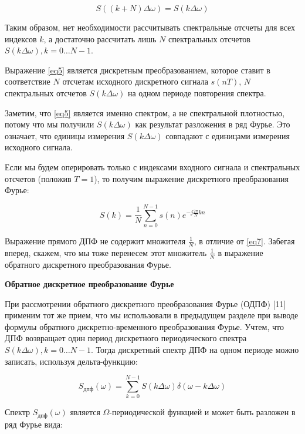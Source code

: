 \begin{equation}
\label{eq6}
S((k+N)\Delta \omega) = S(k \Delta \omega)
\end{equation}

Таким образом, нет необходимости рассчитывать спектральные отсчеты для всех индексов \( k \), а достаточно рассчитать лишь \( N \) спектральных отсчетов \( S(k \Delta \omega), k = 0 \ldots N-1 \).

Выражение \eqref{eq5} является дискретным преобразованием, которое ставит в соответствие \( N \) отсчетам исходного дискретного сигнала \( s(nT) \), \( N \) спектральных отсчетов \( S(k \Delta \omega) \) на одном периоде повторения спектра.

Заметим, что \eqref{eq5} является именно спектром, а не спектральной плотностью, потому что мы получили \( S(k \Delta \omega) \) как результат разложения в ряд Фурье. Это означает, что единицы измерения \( S(k \Delta \omega) \) совпадают с единицами измерения исходного сигнала.

Если мы будем оперировать только с индексами входного сигнала и спектральных отсчетов (положив \( T = 1 \)), то получим выражение дискретного преобразования Фурье:

\begin{equation}
\label{eq7}
S(k) = \frac{1}{N} \sum_{n=0}^{N-1} s(n) e^{-j\frac{2\pi}{N}kn} \tag{2.6}
\end{equation}

Выражение прямого ДПФ не содержит множителя \( \frac{1}{N} \), в отличие от \eqref{eq7}. Забегая вперед, скажем, что мы тоже перенесем этот множитель \( \frac{1}{N} \) в выражение обратного дискретного преобразования Фурье.

\textbf{Обратное дискретное преобразование Фурье}

При рассмотрении обратного дискретного преобразования Фурье (ОДПФ) [11] применим тот же прием, что мы использовали в предыдущем разделе при выводе формулы обратного дискретно-временного преобразования Фурье. Учтем, что ДПФ возвращает один период дискретного периодического спектра \( S(k \Delta \omega), k = 0 \ldots N-1 \). Тогда дискретный спектр ДПФ на одном периоде можно записать, используя дельта-функцию:

\begin{equation}
\label{eq8}
S_{\text{дпф}}(\omega) = \sum_{k=0}^{N-1} S(k \Delta \omega) \delta(\omega - k\Delta \omega) \tag{2.7}
\end{equation}

Спектр \( S_{\text{дпф}}(\omega) \) является \( \Omega \)-периодической функцией и может быть разложен в ряд Фурье вида:

